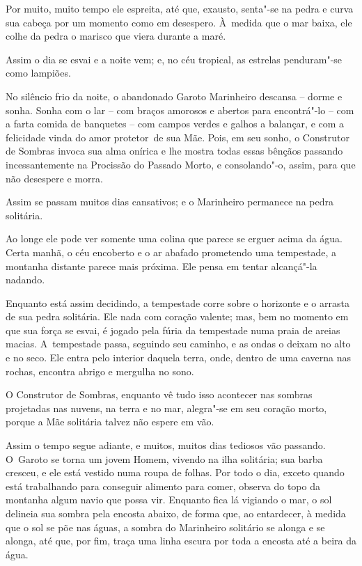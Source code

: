 Por muito, muito tempo ele espreita, até que, exausto, senta"-se na pedra
e curva sua cabeça por um momento como em desespero. À~medida que o
mar baixa, ele colhe da pedra o marisco que viera durante a maré.

Assim o dia se esvai e a noite vem; e, no céu tropical, as estrelas
penduram"-se como lampiões.

No silêncio frio da noite, o abandonado Garoto Marinheiro descansa --
dorme e sonha. Sonha com o lar -- com braços amorosos e abertos
para encontrá"-lo -- com a farta comida de banquetes -- com campos verdes e
galhos a balançar, e com a felicidade vinda do amor protetor~de sua Mãe.
Pois, em seu sonho, o Construtor de Sombras invoca sua alma onírica e
lhe mostra todas essas bênçãos passando incessantemente na Procissão do
Passado Morto, e consolando"-o, assim, para que não desespere e morra.


Assim se passam muitos dias cansativos; e o Marinheiro permanece na
pedra solitária.

Ao longe ele pode ver somente uma colina que parece se erguer acima da
água. Certa manhã, o céu encoberto e o ar abafado prometendo uma
tempestade, a montanha distante parece mais próxima. Ele pensa em
tentar alcançá"-la nadando.

Enquanto está assim decidindo, a tempestade corre sobre o horizonte e o
arrasta de sua pedra solitária. Ele nada com coração valente; mas, bem
no momento em que sua força se esvai, é jogado pela fúria da tempestade
numa praia de areias macias. A~tempestade passa, seguindo seu caminho, e
as ondas o deixam no alto e no seco. Ele entra pelo interior daquela
terra, onde, dentro de uma caverna nas rochas, encontra abrigo e
mergulha no sono.

O Construtor de Sombras, enquanto vê tudo isso acontecer nas sombras
projetadas nas nuvens, na terra e no mar, alegra"-se em seu coração
morto, porque a Mãe solitária talvez não espere em vão.

\smallskip
Assim o tempo segue adiante, e muitos, muitos dias tediosos vão
passando. O~Garoto se torna um jovem Homem, vivendo na ilha solitária;
sua barba cresceu, e ele está vestido numa roupa de folhas. Por todo o
dia, exceto quando está trabalhando para conseguir alimento para comer,
observa do topo da montanha algum navio que possa vir. Enquanto fica lá
vigiando o mar, o sol delineia sua sombra pela encosta abaixo, de forma
que, ao entardecer, à medida que o sol se põe nas águas, a sombra do
Marinheiro solitário se alonga e se alonga, até que, por fim, traça uma
linha escura por toda a encosta até a beira da água.


